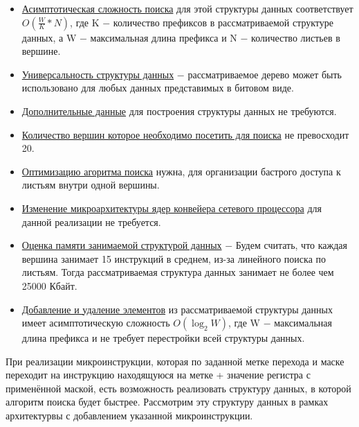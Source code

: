 \documentclass[a4peper, 12pt, titlepage, finall]{report}
\begin{document}
            \begin{itemize}
                \item\underline{Асимптотическая сложность поиска} для этой структуры данных соответствует {\ttfamily $O(\frac{W}{K}*N)$},
                где {\ttfamily K} $-$ количество префиксов в рассматриваемой структуре данных, а {\ttfamily W} $-$ максимальная длина префикса
                и {\ttfamily N} $-$ количество листьев в вершине.
                \item\underline{Универсальность структуры данных} $-$ рассматриваемое дерево может быть использовано для любых данных представимых в битовом виде.
                \item\underline{Дополнительные данные} для построения структуры данных не требуются.
                \item\underline{Количество вершин которое необходимо посетить для поиска} не превосходит 20. 
                \item\underline{Оптимизацию агоритма поиска} нужна, для организации бастрого доступа к листьям внутри одной вершины. 
                \item\underline{Изменение микроархитектуры ядер конвейера сетевого процессора} для данной реализации не требуется.
                \item\underline{Оценка памяти занимаемой структурой данных} $-$ Будем считать, что каждая вершина занимает 15 инструкций в среднем, из-за линейного поиска по листьям. 
                Тогда рассматриваемая структура данных занимает не более чем 25000 Кбайт.
                \item\underline{Добавление и удаление элементов} из рассматриваемой структуры данных имеет асимптотическую сложность 
                {\ttfamily $O(\log_2{W})$}, где {\ttfamily W} $-$ максимальная длина префикса и не требует перестройки всей структуры данных.\\
            \end{itemize}
            При реализации микроинструкции, которая по заданной метке перехода и маске переходит на инструкцию находящуюся на метке + значение регистра с применённой маской,
            есть возможность реализовать структуру данных, в которой алгоритм поиска будет быстрее. Рассмотрим эту структуру данных в рамках архитектурвы с добавлением указанной микроинструкции.\\
\end{document}
